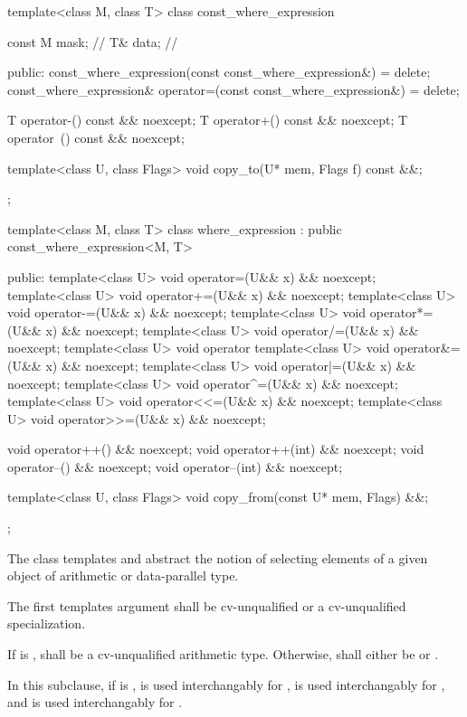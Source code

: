 \begin{codeblock}
template<class M, class T> class const_where_expression {
  const M mask;    // \expos
  T& data;         // \expos

public:
  const_where_expression(const const_where_expression&) = delete;
  const_where_expression& operator=(const const_where_expression&) = delete;

  T operator-() const && noexcept;
  T operator+() const && noexcept;
  T operator~() const && noexcept;

  template<class U, class Flags> void copy_to(U* mem, Flags f) const &&;
};

template<class M, class T>
class where_expression : public const_where_expression<M, T> {
public:
  template<class U> void operator=(U&& x) && noexcept;
  template<class U> void operator+=(U&& x) && noexcept;
  template<class U> void operator-=(U&& x) && noexcept;
  template<class U> void operator*=(U&& x) && noexcept;
  template<class U> void operator/=(U&& x) && noexcept;
  template<class U> void operator%
  template<class U> void operator&=(U&& x) && noexcept;
  template<class U> void operator|=(U&& x) && noexcept;
  template<class U> void operator^=(U&& x) && noexcept;
  template<class U> void operator<<=(U&& x) && noexcept;
  template<class U> void operator>>=(U&& x) && noexcept;

  void operator++() && noexcept;
  void operator++(int) && noexcept;
  void operator--() && noexcept;
  void operator--(int) && noexcept;

  template<class U, class Flags> void copy_from(const U* mem, Flags) &&;
};
\end{codeblock}

\pnum
The class templates  and  abstract the notion of selecting elements of a given object of arithmetic or data-parallel type.

\pnum
The first templates argument  shall be cv-unqualified  or a cv-unqualified  specialization.

\pnum
If  is ,  shall be a cv-unqualified arithmetic type. Otherwise,  shall either be  or .

\pnum
In this subclause, if  is ,  is used interchangably for ,  is used interchangably for , and  is used interchangably for .

